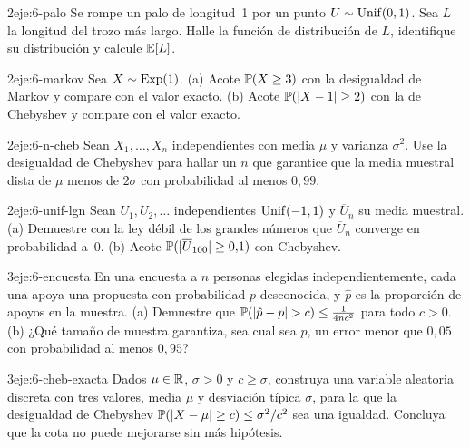 \begin{ejercicio}{2}{eje:6-palo}
Se rompe un palo de longitud~1 por un punto $U\sim\operatorname{Unif}(0,1)$. Sea $L$ la longitud del trozo más largo. Halle la función de distribución de $L$, identifique su distribución y calcule $\mathbb{E}[L]$.
\end{ejercicio}

\begin{ejercicio}{2}{eje:6-markov}
Sea $X\sim\operatorname{Exp}(1)$. (a) Acote $\mathbb{P}(X\ge3)$ con la desigualdad de Markov y compare con el valor exacto. (b) Acote $\mathbb{P}(\lvert X-1\rvert\ge2)$ con la de Chebyshev y compare con el valor exacto.
\end{ejercicio}

\begin{ejercicio}{2}{eje:6-n-cheb}
Sean $X_1,\dots,X_n$ independientes con media $\mu$ y varianza $\sigma^{2}$. Use la desigualdad de Chebyshev para hallar un $n$ que garantice que la media muestral dista de $\mu$ menos de $2\sigma$ con probabilidad al menos $0{,}99$.
\end{ejercicio}

\begin{ejercicio}{2}{eje:6-unif-lgn}
Sean $U_1,U_2,\dots$ independientes $\operatorname{Unif}(-1,1)$ y $\overline U_n$ su media muestral. (a) Demuestre con la ley débil de los grandes números que $\overline U_n$ converge en probabilidad a~0. (b) Acote $\mathbb{P}(\lvert\overline U_{100}\rvert\ge0{,}1)$ con Chebyshev.
\end{ejercicio}

\begin{ejercicio}{3}{eje:6-encuesta}
En una encuesta a $n$ personas elegidas independientemente, cada una apoya una propuesta con probabilidad $p$ desconocida, y $\hat p$ es la proporción de apoyos en la muestra. (a) Demuestre que $\mathbb{P}(\lvert\hat p-p\rvert>c)\le\frac{1}{4nc^{2}}$ para todo $c>0$. (b) ¿Qué tamaño de muestra garantiza, sea cual sea $p$, un error menor que $0{,}05$ con probabilidad al menos $0{,}95$?
\end{ejercicio}

\begin{ejercicio}{3}{eje:6-cheb-exacta}
Dados $\mu\in\mathbb{R}$, $\sigma>0$ y $c\ge\sigma$, construya una variable aleatoria discreta con tres valores, media $\mu$ y desviación típica $\sigma$, para la que la desigualdad de Chebyshev $\mathbb{P}(\lvert X-\mu\rvert\ge c)\le\sigma^{2}/c^{2}$ sea una igualdad. Concluya que la cota no puede mejorarse sin más hipótesis.
\end{ejercicio}

